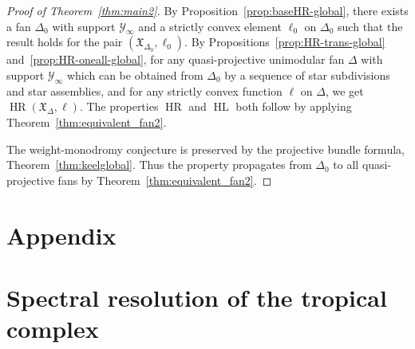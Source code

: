 \documentclass[11pt]{amsart}
\theoremstyle{definition}
\numberwithin{equation}{section}
\renewcommand{\~}{\widetilde}
\DeclareMathOperator{\HR}{HR} %
\DeclareMathOperator{\HL}{HL} %
\newcommand{\X}{\mathfrak X}
\newcommand{\Y}{\mathscr Y}
\begin{document}
\begin{proof}[Proof of Theorem~\ref{thm:main2}] By Proposition~\ref{prop:baseHR-global}, there exists a fan $\Delta_0$ with support $\Y_\infty$ and a strictly convex element $\ell_0$ on $\Delta_0$ such that the result holds for the pair $(\X_{\Delta_0}, \ell_0)$. By Propositions~\ref{prop:HR-trans-global} and~\ref{prop:HR-oneall-global}, for any quasi-projective unimodular fan $\Delta$ with support $\Y_\infty$ which can be obtained from $\Delta_0$ by a sequence of star subdivisions and star assemblies, and for any strictly convex function $\ell$ on $\Delta$, we get $\HR(\X_{\Delta}, \ell)$. The properties $\HR$ and $\HL$ both follow by applying Theorem~\ref{thm:equivalent_fan2}.

\medskip

The weight-monodromy conjecture is preserved by the projective bundle formula, Theorem~\ref{thm:keelglobal}. Thus the property propagates from $\Delta_0$ to all quasi-projective fans by Theorem~\ref{thm:equivalent_fan2}.
\end{proof}

\newpage






\section*{Appendix}

\section{Spectral resolution of the tropical complex}
\label{sec:technicalities}
\end{document}
